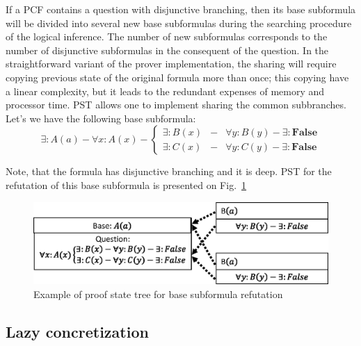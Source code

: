 \documentclass[runningheads,a4paper]{llncs}
\begin{document}
If a PCF contains a question with disjunctive branching, then its base subformula will be divided into several new base subformulas during the searching procedure of the logical inference. The number of new subformulas corresponds to the number of disjunctive subformulas in the consequent of the question. In the straightforward variant of the prover implementation, the sharing will require copying previous state of the original formula more than once; this copying have a linear complexity, but it leads to the redundant expenses of memory and processor time. PST allows one to implement sharing the common subbranches. Let's we have the following base subformula:
$$\exists: A(a) - \forall x: A(x) - \left\{
\begin{array}{lcl}
 \exists \colon B(x) & - & \forall y: B(y) - \exists\colon\boldsymbol{False}\\
 \exists \colon C(x) & - & \forall y: C(y) - \exists\colon\boldsymbol{False}
\end{array}
\right. $$

Note, that the formula has disjunctive branching and it is deep. PST for the refutation of this base subformula is presented on Fig.~\ref{fig:datasharing2}
\begin{figure}[h]
  \vspace{0.5cm}
  \centering
  \includegraphics[width=0.82\linewidth]{img/DataSharing2p1.eps}
  \caption{Example of proof state tree for base subformula refutation}
  \label{fig:datasharing2}
\end{figure}




\subsection{Lazy concretization}
\end{document}
